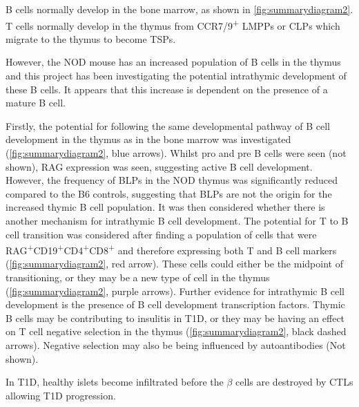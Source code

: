 B cells normally develop in the bone marrow, as shown in \cref{fig:summarydiagram2}.
T cells normally develop in the thymus from CCR7/9\textsuperscript{+} LMPPs or CLPs which migrate to the thymus to become TSPs.

However, the NOD mouse has an increased population of B cells in the thymus and this project has been investigating the potential intrathymic development of these B cells.
It appears that this increase is dependent on the presence of a mature B cell.

Firstly, the potential for following the same developmental pathway of B cell development in the thymus as in the bone marrow was investigated (\cref{fig:summarydiagram2}, blue arrows).
Whilst pro and pre B cells were seen (not shown), RAG expression was seen, suggesting active B cell development.
However, the frequency of BLPs in the NOD thymus was significantly reduced compared to the B6 controls, suggesting that BLPs are not the origin for the increased thymic B cell population.
It was then considered whether there is another mechanism for intrathymic B cell development.
The potential for T to B cell transition was considered after finding a population of cells that were RAG\textsuperscript{+}CD19\textsuperscript{+}CD4\textsuperscript{+}CD8\textsuperscript{+} and therefore expressing both T and B cell markers (\cref{fig:summarydiagram2}, red arrow).
These cells could either be the midpoint of transitioning, or they may be a new type of cell in the thymus (\cref{fig:summarydiagram2}, purple arrows).
Further evidence for intrathymic B cell development is the presence of B cell development transcription factors.
Thymic B cells may be contributing to insulitis in T1D, or they may be having an effect on T cell negative selection in the thymus (\cref{fig:summarydiagram2}, black dashed arrows).
Negative selection may also be being influenced by autoantibodies (Not shown).

In T1D, healthy islets become infiltrated before the $\beta$ cells are destroyed by CTLs allowing T1D progression.


